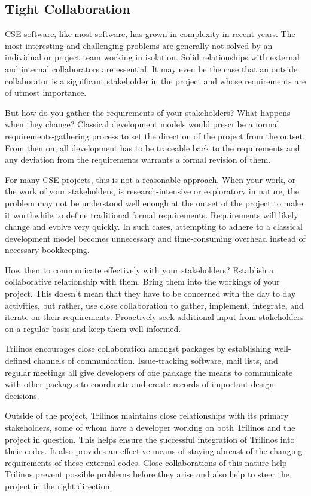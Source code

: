 \documentclass{doublecol}
\begin{document}
\subsection{Tight Collaboration}

CSE software, like most software, has grown in complexity in recent
years. The most interesting and challenging problems are generally
not solved by an individual or project team working in isolation.
Solid relationships with external and internal collaborators are
essential.  It may even be the case that an outside collaborator is
a significant stakeholder in the project and whose requirements are
of utmost importance.

But how do you gather the requirements of your stakeholders?  What
happens when they change?  Classical development models would
prescribe a formal requirements-gathering process to set the
direction of the project from the outset.  From then on, all
development has to be traceable back to the requirements and any
deviation from the requirements warrants a formal revision of them.

For many CSE projects, this is not a reasonable approach.  When your
work, or the work of your stakeholders, is research-intensive or
exploratory in nature, the problem may not be understood well enough
at the outset of the project to make it worthwhile to define
traditional formal requirements.  Requirements will likely change
and evolve very quickly.  In such cases, attempting to adhere to a
classical development model becomes unnecessary and time-consuming
overhead instead of necessary bookkeeping.

How then to communicate effectively with your stakeholders?
Establish a collaborative relationship with them.  Bring them into
the workings of your project.  This doesn't mean that they have to
be concerned with the day to day activities, but rather, use close
collaboration to gather, implement, integrate, and iterate on their
requirements.  Proactively seek additional input from stakeholders
on a regular basis and keep them well informed.

Trilinos encourages close collaboration amongst packages by
establishing well-defined channels of communication.  Issue-tracking
software, mail lists, and regular meetings all give developers of
one package the means to communicate with other packages to
coordinate and create records of important design decisions.

Outside of the project, Trilinos maintains close relationships with
its primary stakeholders, some of whom have a developer working on
both Trilinos and the project in question.  This helps ensure the
successful integration of Trilinos into their codes.  It also
provides an effective means of staying abreast of the changing
requirements of these external codes.  Close collaborations of this
nature help Trilinos prevent possible problems before they arise and
also help to steer the project in the right direction.
\end{document}
